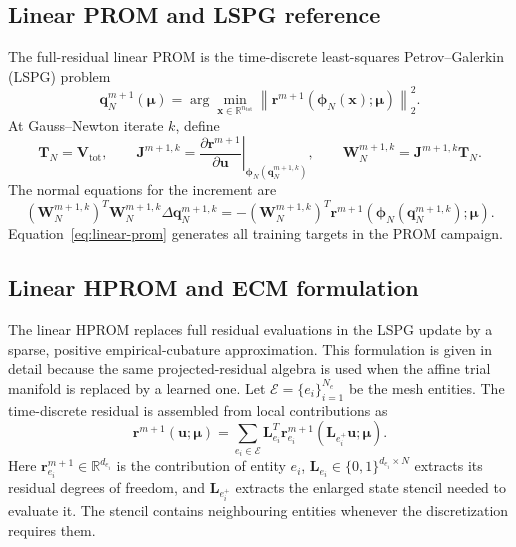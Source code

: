 \documentclass[11pt]{article}
\newcommand{\q}{\mathbf q}
\newcommand{\uvec}{\mathbf u}
\newcommand{\mub}{\bm\mu}
\newcommand{\norm}[1]{\left\lVert #1 \right\rVert}
\begin{document}
\subsection{Linear PROM and LSPG reference}
The full-residual linear PROM is the time-discrete least-squares
Petrov--Galerkin (LSPG) problem
\begin{equation}
\q_N^{m+1}(\mub)=\arg\min_{\mathbf x\in\mathbb R^{n_{\mathrm{tot}}}}
\norm{\mathbf r^{m+1}(\boldsymbol\phi_N(\mathbf x);\mub)}_2^2.
\label{eq:linear-prom}
\end{equation}
At Gauss--Newton iterate $k$, define
\begin{equation}
\mathbf T_N=\mathbf V_{\mathrm{tot}},\qquad
\mathbf J^{m+1,k}=
\left.\frac{\partial\mathbf r^{m+1}}{\partial\uvec}\right|_{
\boldsymbol\phi_N(\q_N^{m+1,k})},\qquad
\mathbf W_N^{m+1,k}=\mathbf J^{m+1,k}\mathbf T_N.
\end{equation}
The normal equations for the increment are
\begin{equation}
\left(\mathbf W_N^{m+1,k}\right)^T\mathbf W_N^{m+1,k}
\Delta\q_N^{m+1,k}=-
\left(\mathbf W_N^{m+1,k}\right)^T
\mathbf r^{m+1}\!\left(\boldsymbol\phi_N(\q_N^{m+1,k});\mub\right).
\label{eq:linear-prom-gn}
\end{equation}
Equation~\eqref{eq:linear-prom} generates all training targets in the PROM
campaign.

\subsection{Linear HPROM and ECM formulation}
\label{sec:linear-hprom}
The linear HPROM replaces full residual evaluations in the LSPG update by a
sparse, positive empirical-cubature approximation.  This formulation is
given in detail because the same projected-residual algebra is used when the
affine trial manifold is replaced by a learned one.  Let
$\mathcal E=\{e_i\}_{i=1}^{N_e}$ be the mesh entities.  The time-discrete
residual is assembled from local contributions as
\begin{equation}
\mathbf r^{m+1}(\uvec;\mub)=\sum_{e_i\in\mathcal E}\mathbf L_{e_i}^T
\mathbf r_{e_i}^{m+1}(\mathbf L_{e_i^+}\uvec;\mub).
\label{eq:entity-residual}
\end{equation}
Here $\mathbf r_{e_i}^{m+1}\in\mathbb R^{d_{e_i}}$ is the contribution of
entity $e_i$, $\mathbf L_{e_i}\in\{0,1\}^{d_{e_i}\times N}$ extracts its
residual degrees of freedom, and $\mathbf L_{e_i^+}$ extracts the enlarged
state stencil needed to evaluate it.  The stencil contains neighbouring
entities whenever the discretization requires them.
\end{document}
